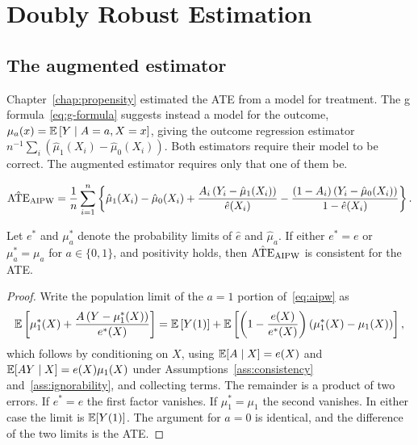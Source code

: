 \chapter{Doubly Robust Estimation}
\label{chap:doubly-robust}

\section{The augmented estimator}
\label{sec:dr-aipw}

Chapter~\ref{chap:propensity} estimated the ATE from a model for treatment.
The g formula~\eqref{eq:g-formula} suggests instead a model for the outcome,
$\mu_a(x) = \mathbb{E}\left[ Y \mid A = a, X = x \right]$, giving the outcome regression
estimator $n^{-1}\sum_i \left( \hat{\mu}_1(X_i) - \hat{\mu}_0(X_i) \right)$.
Both estimators require their model to be correct. The augmented estimator
requires only that one of them be.

\begin{definition}
\label{def:aipw}
\begin{equation}
  \hat{\mathrm{ATE}}_{\mathrm{AIPW}} = \frac{1}{n} \sum_{i=1}^{n} \left\{
    \hat{\mu}_1(X_i) - \hat{\mu}_0(X_i)
    + \frac{A_i \left( Y_i - \hat{\mu}_1(X_i) \right)}{\hat{e}(X_i)}
    - \frac{(1 - A_i)\left( Y_i - \hat{\mu}_0(X_i) \right)}{1 - \hat{e}(X_i)}
  \right\}.
  \label{eq:aipw}
\end{equation}
\end{definition}

\begin{theorem}
\label{thm:double-robustness}
Let $e^{*}$ and $\mu_a^{*}$ denote the probability limits of $\hat{e}$ and
$\hat{\mu}_a$. If either $e^{*} = e$ or $\mu_a^{*} = \mu_a$ for $a \in \{0,1\}$,
and positivity holds, then $\hat{\mathrm{ATE}}_{\mathrm{AIPW}}$ is consistent for the
ATE.
\end{theorem}

\begin{proof}
Write the population limit of the $a = 1$ portion of~\eqref{eq:aipw} as
\begin{equation*}
  \mathbb{E}\left[ \mu_1^{*}(X) + \frac{A\left( Y - \mu_1^{*}(X) \right)}{e^{*}(X)} \right]
  = \mathbb{E}\left[ Y(1) \right]
    + \mathbb{E}\left[ \left( 1 - \frac{e(X)}{e^{*}(X)} \right)
               \left( \mu_1^{*}(X) - \mu_1(X) \right) \right],
\end{equation*}
which follows by conditioning on $X$, using $\mathbb{E}[A \mid X] = e(X)$ and
$\mathbb{E}[AY \mid X] = e(X)\mu_1(X)$ under Assumptions~\ref{ass:consistency}
and~\ref{ass:ignorability}, and collecting terms. The remainder is a product of
two errors. If $e^{*} = e$ the first factor vanishes. If $\mu_1^{*} = \mu_1$ the
second vanishes. In either case the limit is $\mathbb{E}[Y(1)]$. The argument for
$a = 0$ is identical, and the difference of the two limits is the ATE.
\end{proof}

